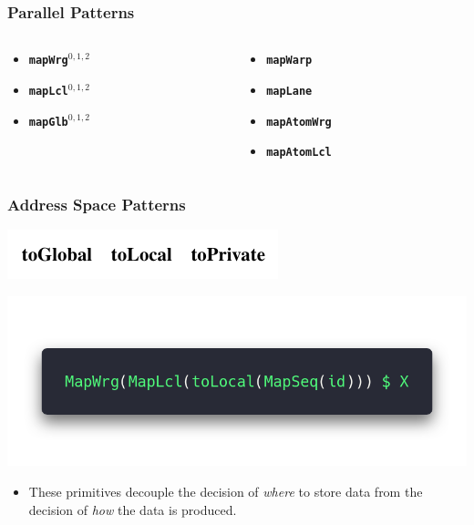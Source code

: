 \documentclass[10pt]{beamer}
\newcommand{\code}[1]{\textbf{\texttt{#1}}}
\begin{document}
\begin{frame}
\frametitle{Parallel Patterns}
\begin{columns}[onlytextwidth]
\begin{column}{0.45\textwidth}
\begin{itemize}
	\item \code{mapWrg$^{0, 1, 2}$}
	\item \code{mapLcl$^{0, 1, 2}$}
	\item \code{mapGlb$^{0, 1, 2}$}
\end{itemize}
\end{column}
\begin{column}{0.45\textwidth}
\begin{itemize}	
	\item \code{mapWarp}
	\item \code{mapLane}
\vspace{.5cm}
	\item \code{mapAtomWrg}
	\item \code{mapAtomLcl}
\end{itemize}
\end{column}
\end{columns}
\end{frame}

\begin{frame}
\frametitle{Address Space Patterns}
    \begin{block}{}
        \begin{center}
            \includegraphics[width=.55\textwidth]{../images/address_space_patterns.pdf}
        \end{center}
        \begin{center}
            \includegraphics[width=.55\textwidth]{../images/toLocal.png}
        \end{center}
    \end{block}
\begin{itemize}
    \item These primitives decouple the decision of \textit{where} to store data from the decision of \textit{how} the data is produced.
\end{itemize}
\end{frame}
\end{document}
